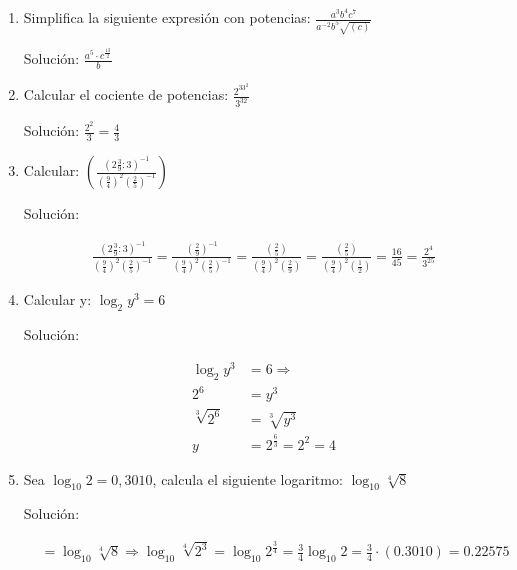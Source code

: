 \documentclass[11pt,letterpaper]{article}
\begin{document}
\begin{enumerate}

	\item Simplifica la siguiente expresión con potencias: $\frac{a^3b^4c^7}{a^{-2}b^5\sqrt{(c)}}$

	Solución: $\frac{a^5 \cdot c^{\frac{13}{2}}}{b}$

	\item Calcular el cociente de potencias: $\frac{2^33^2}{3^32}$

	Solución: $\frac{2^2}{3} = \frac{4}{3}$
	
	\item Calcular: $\left( \frac{\left( 2 \frac{3}{9} : 3\right)^{-1}}{\left(\frac{9}{4}\right)^2\left(\frac{2}{5}\right)^{-1}} \right)$

	Solución:
	
	\begin{align}
		\frac{\left( 2 \frac{3}{9} : 3\right)^{-1}}{\left(\frac{9}{4}\right)^2\left(\frac{2}{5}\right)^{-1}}
		= \frac{\left(  \frac{2}{9} \right)^{-1}}{\left(\frac{9}{4}\right)^2\left(\frac{2}{5}\right)^{-1}}
		= \frac{\left(  \frac{2}{5} \right)}{\left(\frac{9}{4}\right)^2\left(\frac{2}{9}\right)}
		= \frac{\left(  \frac{2}{5} \right)}{\left(\frac{9}{4}\right)^2\left(\frac{1}{2}\right)}
		= \frac{16}{45}
		= \frac{2^4}{3^25}
	\end{align}

	\item Calcular y: $\log_{2}y^3 = 6$

	Solución:
	
	\begin{align*}
		\log_{2}y^3 &= 6 \Rightarrow \\  
		2^6 &= y^3 \\
		\sqrt[3]{2^6} &= \sqrt[3]{y^3} \\
		y &= 2^{\frac{6}{3}} = 2^2 = 4
	\end{align*}
	
	\item Sea $\log_{10}2 = 0,3010$, calcula el siguiente logaritmo: $\log_{10}\sqrt[4]{8}$

	Solución:

	\begin{align*}
		&= \log_{10}\sqrt[4]{8} \Rightarrow \log_{10}\sqrt[4]{2^3} = \log_{10}2^{\frac{3}{4}} = \frac{3}{4}\log_{10}2 = \frac{3}{4} \cdot (0.3010) = 0.22575
	\end{align*}


\end{enumerate}
\end{document}
